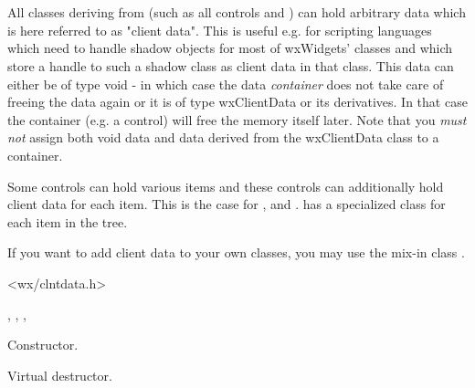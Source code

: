 \section{}\label{wxclientdata}

All classes deriving from 
(such as all controls and )
can hold arbitrary data which is here referred to as "client data".
This is useful e.g. for scripting languages which need to handle
shadow objects for most of wxWidgets' classes and which store
a handle to such a shadow class as client data in that class.
This data can either be of type void - in which case the data
{\it container} does not take care of freeing the data again
or it is of type wxClientData or its derivatives. In that case the
container (e.g. a control) will free the memory itself later.
Note that you {\it must not} assign both void data and data
derived from the wxClientData class to a container.

Some controls can hold various items and these controls can
additionally hold client data for each item. This is the case for
, 
and . 
has a specialized class 
for each item in the tree.

If you want to add client data to your own classes, you may
use the mix-in class .


<wx/clntdata.h>


, ,
, 



\label{wxclientdatawxclientdata}


Constructor.

\label{wxclientdatadtor}


Virtual destructor.

\section{}\label{wxclientdatacontainer}

